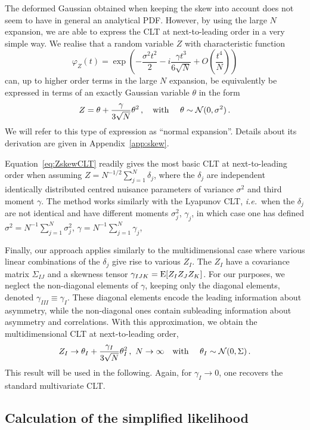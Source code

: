 \documentclass[11pt]{article}
\def\ie{{\it i.e.}}
\newcommand{\be}{\begin{equation}}
\newcommand{\ee}{\end{equation}}
\begin{document}
The deformed Gaussian obtained when keeping the skew into account does not seem to have in general an analytical PDF. 
However, by using the large $N$ expansion, we are able to express the CLT at next-to-leading order in a very simple way. 
We realise that a random variable $Z$ with characteristic function
\be
\varphi_Z(t)=\exp\left(-\frac{\sigma^2 t^2}{2}-i \frac{\gamma t^3}{6 \sqrt{N}} +O\left(\frac{t^4}{N}\right)\right) \label{eq:CF_CLT}
 \ee
can, up to higher order terms in the large $N$ expansion, be equivalently be expressed in terms of an exactly Gaussian variable $\theta$ in the form
\be
Z= \theta+\frac{\gamma}{3\sqrt{N}}\theta^2\,,  \quad \textrm{with } \quad \theta\sim{\cal N}(0,\sigma^2)\,. \label{eq:ZskewCLT}
\ee
We will refer to this type of expression as ``normal expansion''. Details about its derivation are given in Appendix~\ref{app:skew}.


Equation~\eqref{eq:ZskewCLT}  readily gives the most basic CLT at next-to-leading order when assuming $Z=N^{-1/2}\sum_{j=1}^N \delta_j$, where the $\delta_j$ are  independent identically distributed centred nuisance parameters  of variance $\sigma^2$ and third moment $\gamma$. The method works similarly with the Lyapunov CLT, \ie\ when the $\delta_j$ are not identical and have different moments $\sigma^2_j$, $\gamma_j$, in which case one has defined $\sigma^2=N^{-1}\sum_{j=1}^N \sigma_j^2$, $\gamma=N^{-1}\sum_{j=1}^N \gamma_j$,

Finally, our approach applies similarly to the multidimensional case where various linear combinations of the $\delta_j$ give rise to various $Z_I$. The $Z_I$ have a covariance matrix $\Sigma_{IJ}$ and a skewness tensor $\gamma_{IJK}={\rm E}[Z_IZ_JZ_K]$. For our purposes, we neglect the non-diagonal elements of $\gamma$, keeping only  the diagonal elements, denoted $\gamma_{III}\equiv \gamma_I$. These diagonal elements encode the leading information about asymmetry, while the non-diagonal ones contain subleading information about asymmetry and correlations. With this approximation, we obtain the multidimensional CLT at next-to-leading order,
\be
Z_I\rightarrow \theta_I+\frac{\gamma_{I}}{3\sqrt{N}}\theta_I^2\,,\,\,N\rightarrow \infty  \quad \textrm{with } \quad \theta_I\sim{\cal N}(0,\Sigma)\,. \label{eq:NLCFT}
\ee
 This  result will be used in the following. Again, for $\gamma_I\rightarrow 0$, one recovers the standard multivariate CLT.



\subsection{Calculation of the simplified likelihood}
\label{se:analytic}
\end{document}
